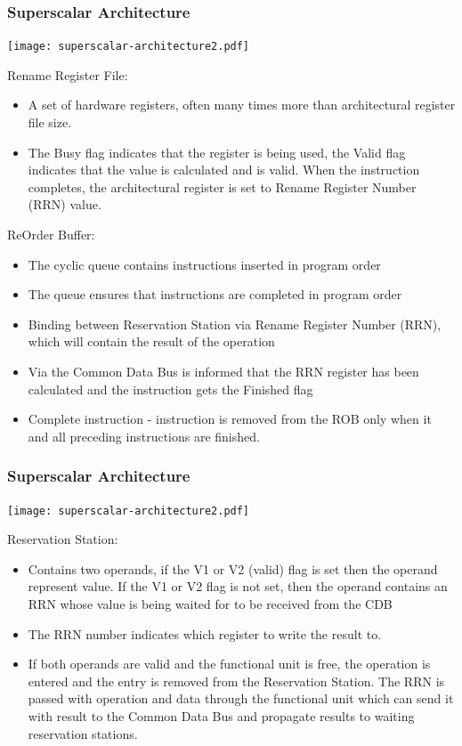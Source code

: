 \documentclass{beamer}
\begin{document}
\begin{frame}[shrink=1]
\frametitle{Superscalar Architecture}

\begin{center}
\texttt{[image: superscalar-architecture2.pdf]}
\end{center}

\scriptsize
Rename Register File:
\begin{itemize}
\item A set of hardware registers, often many times more than architectural register file size.
\item The Busy flag indicates that the register is being used, the Valid flag indicates that the value is calculated and is valid. When the instruction completes, the architectural register is set to Rename Register Number (RRN) value.
\end{itemize}

ReOrder Buffer:
\begin{itemize}
\item The cyclic queue contains instructions inserted in program order
\item The queue ensures that instructions are completed in program order
\item Binding between Reservation Station via Rename Register Number (RRN), which will contain the result of the operation
\item Via the Common Data Bus is informed that the RRN register has been calculated and the instruction gets the Finished flag
\item Complete instruction - instruction is removed from the ROB only when it and all preceding instructions are finished.
\end{itemize}


\end{frame}

\begin{frame}
\frametitle{Superscalar Architecture}

\begin{center}
\texttt{[image: superscalar-architecture2.pdf]}
\end{center}

\scriptsize
Reservation Station:
\begin{itemize}
\item Contains two operands, if the V1 or V2 (valid) flag is set then the operand represent value. If the V1 or V2 flag is not set, then the operand contains an RRN whose value is being waited for to be received from the CDB
\item The RRN number indicates which register to write the result to.
\item If both operands are valid and the functional unit is free, the operation is entered and the entry is removed from the Reservation Station. The RRN is passed with operation and data through the functional unit which can send it with result to the Common Data Bus and propagate results to waiting reservation stations.
\end{itemize}

\end{frame}
\end{document}
